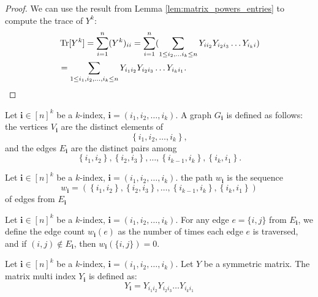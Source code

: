 \begin{proof}
\notready
We can use the result from Lemma \ref{lem:matrix_powers_entries} to compute the trace of $Y^k$:
\begin{align*}
&\operatorname{Tr}[Y^{k}] = \sum_{i=1}^{n} (Y^{k})_{ii} = \sum_{i=1}^{n} (\sum_{1\leq i_{2}, \ldots i_{k} \leq n} Y_{i i_{2}} Y_{i_{2}i_{3}} \ldots Y_{i_{k} i}) \\
&= \sum_{1\leq i_{1}, i_{2}, \ldots, i_{k} \leq n} Y_{i_{1} i_{2}} Y_{i_{2} i_{3}} \ldots Y_{i_{k} i_{1}}.
\end{align*}

\end{proof}

\begin{definition}
    \label{def:graph_multi_index}
    \notready
    Let $\mathbf{i} \in[n]^k$ be a $k$-index, $\mathbf{i}=\left(i_1, i_2, \ldots, i_k\right)$. A graph $G_{\mathbf{i}}$ is defined as follows: the vertices $V_{\mathbf{i}}$ are the distinct elements of
    $$\left\{i_1, i_2, \ldots, i_k\right\},$$
     and the edges $E_{\mathbf{i}}$ are the distinct pairs among
    $$\left\{i_1, i_2\right\},\left\{i_2, i_3\right\}, \ldots,\left\{i_{k-1}, i_k\right\},\left\{i_k, i_1\right\}.$$
\end{definition}

\begin{definition}
  \label{def:graph_path}
  \notready
  Let $\mathbf{i} \in[n]^k$ be a $k$-index, $\mathbf{i}=\left(i_1, i_2, \ldots, i_k\right)$. the path $w_{\mathbf{i}}$ is the sequence
$$
w_{\mathbf{i}}=\left(\left\{i_1, i_2\right\},\left\{i_2, i_3\right\}, \ldots,\left\{i_{k-1}, i_k\right\},\left\{i_k, i_1\right\}\right)
$$
of edges from $E_{\mathbf{i}}$
\end{definition}

\begin{definition}
    \label{def:graph_edge_count}
    \notready
    Let $\mathbf{i} \in[n]^k$ be a $k$-index, $\mathbf{i}=\left(i_1, i_2, \ldots, i_k\right)$. For any edge $e=\{i,j\}$ from $E_{\mathbf{i}}$, we define the edge count $w_{\mathbf{i}}(e)$ as the number of times each edge $e$ is traversed, and if $(i, j) \notin E_{\mathbf{i}}$, then $w_{\mathbf{i}}(\{i, j\}) = 0$.
\end{definition}

\begin{definition}
    \label{def:matrix_multi_index}
    \notready
    Let $\mathbf{i} \in[n]^k$ be a $k$-index, $\mathbf{i}=\left(i_1, i_2, \ldots, i_k\right)$. Let $Y$ be a symmetric matrix. The matrix multi index $Y_{\mathbf{i}}$ is defined as:
    $$
    Y_{\mathbf{i}} = Y_{i_{1}i_{2}} Y_{i_{2}i_{3}} \ldots Y_{i_{k}i_{1}}
    $$
\end{definition}

